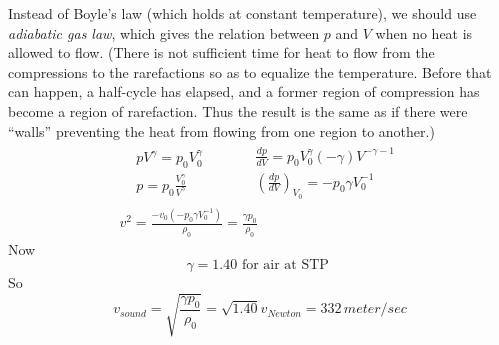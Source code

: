 \documentclass[twoside, 10pt]{amsart}
\begin{document}
Instead of Boyle's law (which holds at constant temperature), we should use \emph{adiabatic gas law}, which gives the relation between $p$ and $V$ when no heat is allowed to flow.  (There is not sufficient time for heat to flow from the compressions to the rarefactions so as to equalize the temperature.  Before that can happen, a half-cycle has elapsed, and a former region of compression has become a region of rarefaction.  Thus the result is the same as if there were ``walls'' preventing the heat from flowing from one region to another.) 
\[
\begin{gathered}
  \begin{aligned}
    & pV^{\gamma} = p_0 V_0^{\gamma} \\
    & p = p_0 \frac{V_0^{\gamma}}{ V^{\gamma} }
  \end{aligned} \quad \quad \, 
  \begin{aligned}
    & \frac{dp}{dV} = p_0 V_0^{\gamma} (-\gamma) V^{-\gamma -1} \\
    & \left( \frac{dp}{dV} \right)_{V_0} = - p_0 \gamma V_0^{-1} 
  \end{aligned} \\
  v^2 = \frac{-v_0 (- p_0 \gamma V_0^{-1}) }{ \rho_0 } = \frac{\gamma p_0}{\rho_0}
\end{gathered}
\]
Now
\[
\gamma = 1.40 \text{ for air at STP }
\]
So
\[
v_{sound} = \sqrt{ \frac{ \gamma p_0}{ \rho_0} } = \sqrt{1.40} v_{Newton} = 332 \, meter/sec
\]
\end{document}
